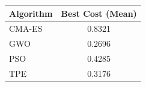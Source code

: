 \begin{table}[h]
\centering
\begin{tabular}{lc}
\toprule
Algorithm & Best Cost (Mean) \\
\midrule
CMA-ES & 0.8321 \\
GWO & 0.2696 \\
PSO & 0.4285 \\
TPE & 0.3176 \\
\bottomrule
\end{tabular}
\end{table}
